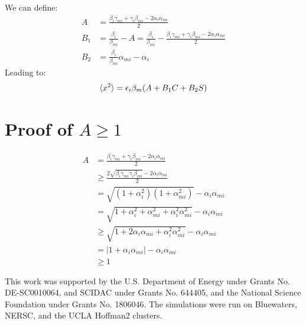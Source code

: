 \documentclass[%
reprint, superscriptaddress,
 amsmath,amssymb, aps,
prstab,
]{revtex4-2}
\begin{document}
 We can define: 
\begin{equation} 
\begin{aligned} A &= \frac{\beta_i
\gamma_{mi}+\gamma_i \beta_{mi}-2\alpha_i \alpha_{mi}}{2} \\ B_1 &=
\frac{\beta_i}{\beta_{mi}} - A = \frac{\beta_i}{\beta_{mi}}
-\frac{\beta_i \gamma_{mi}+\gamma_i \beta_{mi}-2\alpha_i \alpha_{mi}}{2}
\\ B_2 &= \frac{\beta_i}{\beta_{mi}}\alpha_{mi}-\alpha_i \end{aligned} 
\end{equation}
Leading to: \begin{equation} \braket{x^2} = \epsilon_i\beta_m(A + B_1 C +
B_2 S) \end{equation}

\section{Proof of $A \geqslant 1$} 
\begin{equation} \begin{aligned}
A &= \frac{\beta_i \gamma_{mi}+\gamma_i \beta_{mi}-2\alpha_i
\alpha_{mi}}{2} \\ & \geqslant \frac{2\sqrt{\beta_i \gamma_{mi}\gamma_i
\beta_{mi}}-2\alpha_i \alpha_{mi}}{2} \\ &=
\sqrt{(1+\alpha_i^2)(1+\alpha_{mi}^2)}-\alpha_i \alpha_{mi} \\ &=
\sqrt{1+\alpha_i^2 +\alpha_{mi}^2+ \alpha_i^2\alpha_{mi}^2 }-\alpha_i
\alpha_{mi} \\ & \geqslant \sqrt{1+2\alpha_i \alpha_{mi}+
\alpha_i^2\alpha_{mi}^2 }-\alpha_i \alpha_{mi} \\ & = |1+\alpha_i
\alpha_{mi} | -\alpha_i \alpha_{mi} \\ & \geqslant 1 \end{aligned}
\end{equation}
\begin{acknowledgments} This work was supported by the U.S. Department of
Energy under Grants No. DE-SC0010064, and SCIDAC under Grants No. 644405, and the National Science Foundation under Grants No. 1806046. The simulations were run on Bluewaters, NERSC, and the UCLA Hoffman2 clusters. \end{acknowledgments}
% 

\end{document}
